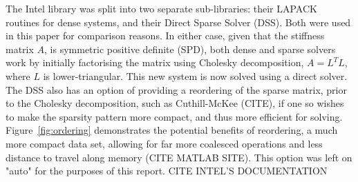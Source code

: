 The Intel library was split into two separate sub-libraries: their LAPACK routines for dense systems, and their Direct Sparse Solver (DSS). Both were used in this paper for comparison reasons. In either case, given that the stiffness matrix $A$, is symmetric positive definite (SPD), both dense and sparse solvers work by initially factorising the matrix using Cholesky decomposition, $A = L^T L$, where $L$ is lower-triangular. This new system is now solved using a direct solver. The DSS also has an option of providing a reordering of the sparse matrix, prior to the Cholesky decomposition, such as Cuthill-McKee (CITE), if one so wishes to make the sparsity pattern more compact, and thus more efficient for solving. Figure~\ref{fig:ordering} demonstrates the potential benefits of reordering, a much more compact data set, allowing for far more coalesced operations and less distance to travel along memory (CITE MATLAB SITE). This option was left on "auto" for the purposes of this report. 
CITE INTEL'S DOCUMENTATION
